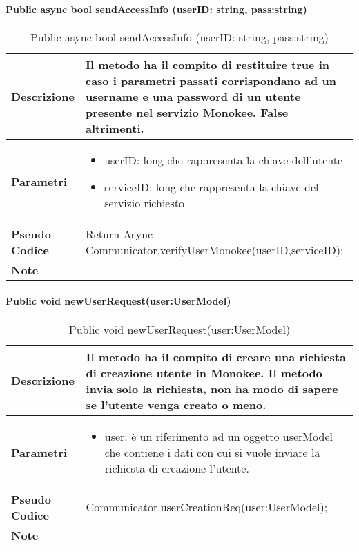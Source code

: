 \paragraph{Public async bool sendAccessInfo (userID: string, pass:string)}
\begin{center}
    \begin{longtable}{|p{3cm}|p{9cm}|}%
    \caption{Public async bool sendAccessInfo (userID: string, pass:string)}
    \endfirsthead
    \endhead
    \hline
    \textbf{Descrizione} & Il metodo ha il compito di restituire true in caso i parametri passati corrispondano ad un username e una password di un utente presente nel servizio Monokee. False altrimenti.\\
    \hline
    \textbf{Parametri} &      
    \begin{itemize}
        \item userID: long che rappresenta la chiave dell’utente
        \item serviceID: long che rappresenta la chiave del servizio richiesto
    \end{itemize}
    \\
    \hline
    \textbf{Pseudo Codice} & 
    Return Async Communicator.verifyUserMonokee(userID,serviceID);
    \\
    \hline
    \textbf{Note} & 
    -
    \\
    \hline
    \end{longtable}
    \end{center}



\paragraph{Public void newUserRequest(user:UserModel)}
\begin{center}
    \begin{longtable}{|p{3cm}|p{9cm}|}%
    \caption{Public void newUserRequest(user:UserModel)}
    \endfirsthead
    \endhead
    \hline
    \textbf{Descrizione} & Il metodo ha il compito di creare una richiesta di creazione utente in Monokee. Il metodo invia solo la richiesta, non ha modo di sapere se l’utente venga creato o meno.\\
    \hline
    \textbf{Parametri} &      
    \begin{itemize}
        \item user: è un riferimento ad un oggetto userModel che contiene i dati con cui si vuole inviare la richiesta di creazione l’utente.
    \end{itemize}
    \\
    \hline
    \textbf{Pseudo Codice} & 
    Communicator.userCreationReq(user:UserModel);
    \\
    \hline
    \textbf{Note} & 
    -
    \\
    \hline
    \end{longtable}
    \end{center}


